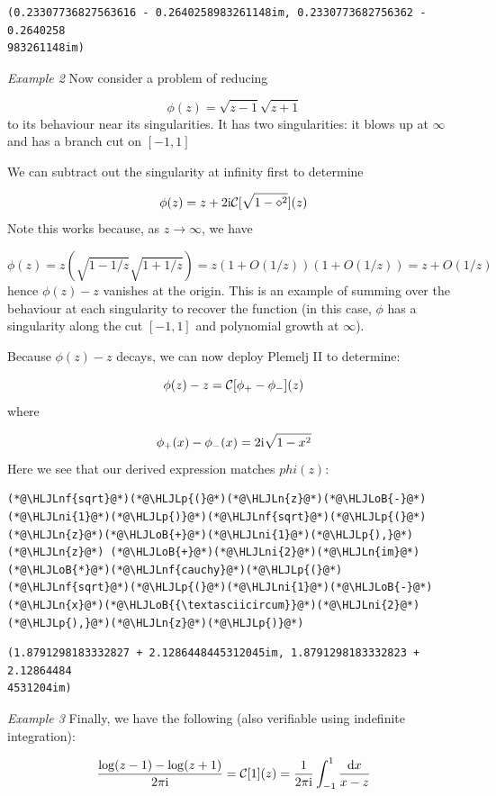 \documentclass[12pt,a4paper]{article}
\newcommand{\HLJLn}[1]{#1}
\newcommand{\HLJLnf}[1]{\textcolor[RGB]{66,102,213}{#1}}
\newcommand{\HLJLni}[1]{\textcolor[RGB]{59,151,46}{#1}}
\newcommand{\HLJLoB}[1]{\textcolor[RGB]{102,102,102}{\textbf{#1}}}
\newcommand{\HLJLp}[1]{#1}
\def\D{ {\rm d} }
\def\I{ {\rm i} }
\def\CC{ {\cal C} }
\def\dx{\D x}
\begin{document}
\begin{lstlisting}
(0.23307736827563616 - 0.2640258983261148im, 0.2330773682756362 - 0.2640258
983261148im)
\end{lstlisting}


\emph{Example 2} Now consider a problem of reducing 

\[
\phi(z) = \sqrt{z-1} \sqrt{z+1}
\]
to its behaviour near its singularities. It has two singularities: it blows up at $\infty$ and has a branch cut on $[-1,1]$

We can subtract out the singularity at infinity first to determine

\[
\phi(z) = z  + 2 \I {\cal C}[\sqrt{1-\diamond^2}](z)
\]
Note this works because, as $z \rightarrow \infty$, we have 

\[
\phi(z) = z (\sqrt{1-{1/z}}\sqrt{1 + {1/z}}) = z (1 + O({1/z}))(1+O(1/z)) = z + O(1/z)
\]
hence $\phi(z) - z$ vanishes at the origin. This is an example of summing over the behaviour at each singularity to  recover the function (in this case, $\phi$ has a singularity along the cut $[-1,1]$ and polynomial growth at $\infty$). 

Because $\phi(z)-z$ decays, we can now deploy Plemelj II to determine:

\[
\phi(z) -z = \CC[\phi_+-\phi_-](z)
\]
where

\[
\phi_+(x) - \phi_-(x) = 2\I \sqrt{1-x^2}
\]
Here we see that our derived expression matches $phi(z)$:


\begin{lstlisting}
(*@\HLJLnf{sqrt}@*)(*@\HLJLp{(}@*)(*@\HLJLn{z}@*)(*@\HLJLoB{-}@*)(*@\HLJLni{1}@*)(*@\HLJLp{)}@*)(*@\HLJLnf{sqrt}@*)(*@\HLJLp{(}@*)(*@\HLJLn{z}@*)(*@\HLJLoB{+}@*)(*@\HLJLni{1}@*)(*@\HLJLp{),}@*) (*@\HLJLn{z}@*) (*@\HLJLoB{+}@*)(*@\HLJLni{2}@*)(*@\HLJLn{im}@*)(*@\HLJLoB{*}@*)(*@\HLJLnf{cauchy}@*)(*@\HLJLp{(}@*)(*@\HLJLnf{sqrt}@*)(*@\HLJLp{(}@*)(*@\HLJLni{1}@*)(*@\HLJLoB{-}@*)(*@\HLJLn{x}@*)(*@\HLJLoB{{\textasciicircum}}@*)(*@\HLJLni{2}@*)(*@\HLJLp{),}@*)(*@\HLJLn{z}@*)(*@\HLJLp{)}@*)
\end{lstlisting}

\begin{lstlisting}
(1.8791298183332827 + 2.1286448445312045im, 1.8791298183332823 + 2.12864484
4531204im)
\end{lstlisting}


\emph{Example 3} Finally, we have the following (also verifiable using indefinite integration):

\[
{\log(z-1) - \log(z+1) \over 2 \pi \I} =  {\cal C}[1](z) = {1 \over 2 \pi \I} \int_{-1}^1 {\dx \over x -z}
\]
\end{document}
